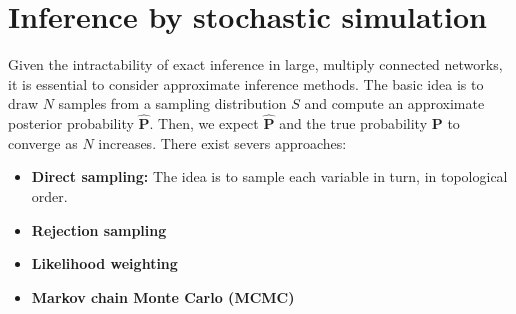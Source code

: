 \section{Inference by stochastic simulation}
Given the intractability of exact inference in large, multiply connected networks, it is essential to consider approximate inference methods. The basic idea is to draw $N$ samples from a sampling distribution $S$ and compute an approximate posterior probability $\hat{\textbf{P}}$. Then, we expect $\hat{\textbf{P}}$ and the true probability $\textbf{P}$ to converge as $N$ increases. There exist severs approaches:
\begin{itemize}
    \item \textbf{Direct sampling:}  The idea is to sample each variable in turn, in topological order.

    \item \textbf{Rejection sampling} 

    \item \textbf{Likelihood weighting}

    \item \textbf{Markov chain Monte Carlo (MCMC)}
\end{itemize}
